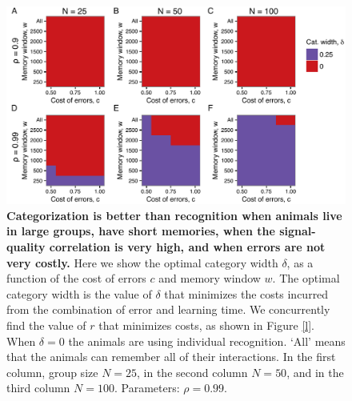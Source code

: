 \begin{figure}
\includegraphics[width=6.85in]{figures/strategies_heat_maps.pdf}
\caption{\sffamily\small\textbf{Categorization is better than recognition when animals live in large groups, have short memories, when the signal-quality correlation is very high, and when errors are not very costly.} Here we show the optimal category width $\delta$, as a function of the cost of errors $c$ and memory window $w$. The optimal category width is the value of $\delta$ that minimizes the costs incurred from the combination of error and learning time. We concurrently find the value of $r$ that minimizes costs, as shown in Figure \ref{l}. When $\delta=0$ the animals are using individual recognition. `All' means that the animals can remember all of their interactions. In the first column, group size $N=25$, in the second column $N=50$, and in the third column $N=100$. Parameters: $\rho=0.99$. }
\label{opt_delta}
\end{figure}


